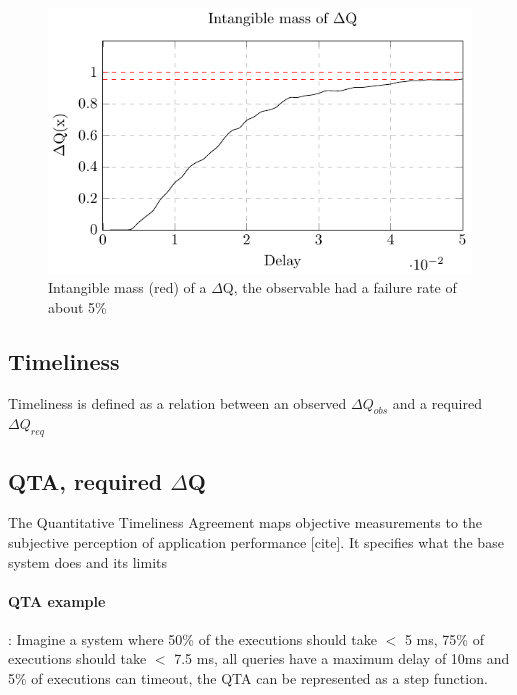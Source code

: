     \begin{figure}[H]
        \begin{center}
            \includegraphics{tikz/intangible.pdf}
        \end{center}
        \caption{Intangible mass (red) of a $\Delta$Q, the observable had a failure rate of about 5\% }
    \end{figure}

    \subsection{Timeliness}
        Timeliness is defined as a relation between an observed $\Delta Q_{obs}$ and a required $\Delta Q_{req}$
     
    \subsection{QTA, required $\Delta$Q}
         The Quantitative Timeliness Agreement maps objective measurements to the subjective perception of application performance [cite]. It specifies what the base system does and its limits
         \paragraph{QTA example}: Imagine a system where 50\% of the executions should take $<$ 5 ms, 75\% of executions should take $<$ 7.5 ms, all queries have a maximum delay of 10ms and 5\% of executions can timeout, the QTA can be represented as a step function.


